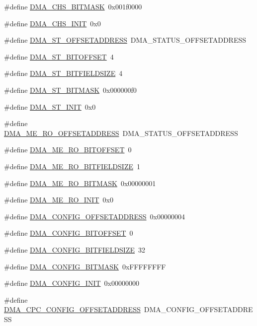 \begin{DoxyCompactItemize}
\#define \hyperlink{a00547_a206b7f6a5fd6825d63adce73eb67d29d}{DMA\_\-CHS\_\-BITMASK}~0x001f0000
\item 
\#define \hyperlink{a00547_a9e3e6d6c98a2c203c72cee4f2af8c047}{DMA\_\-CHS\_\-INIT}~0x0
\item 
\#define \hyperlink{a00547_ac7e7a79a4c4739fbf9669e6bf96cc4ff}{DMA\_\-ST\_\-OFFSETADDRESS}~DMA\_\-STATUS\_\-OFFSETADDRESS
\item 
\#define \hyperlink{a00547_ab86bc68bfb1dca7b3d90155b4103c3d0}{DMA\_\-ST\_\-BITOFFSET}~4
\item 
\#define \hyperlink{a00547_a8f73d54fc0c18d5e34dc3d38b52e7530}{DMA\_\-ST\_\-BITFIELDSIZE}~4
\item 
\#define \hyperlink{a00547_a2807548dce19bf6af704d4105594f939}{DMA\_\-ST\_\-BITMASK}~0x000000f0
\item 
\#define \hyperlink{a00547_a7225e7cc30263f04e1d64a6e733395e6}{DMA\_\-ST\_\-INIT}~0x0
\item 
\#define \hyperlink{a00547_a8374a7407aee39edbbb903b5513078a7}{DMA\_\-ME\_\-RO\_\-OFFSETADDRESS}~DMA\_\-STATUS\_\-OFFSETADDRESS
\item 
\#define \hyperlink{a00547_aa9fdcb43a5bb459dc7c50fc9efe07104}{DMA\_\-ME\_\-RO\_\-BITOFFSET}~0
\item 
\#define \hyperlink{a00547_ab191598835ef6e704ce74741f59ef514}{DMA\_\-ME\_\-RO\_\-BITFIELDSIZE}~1
\item 
\#define \hyperlink{a00547_a259092933e96607ce026d7e333d1f03d}{DMA\_\-ME\_\-RO\_\-BITMASK}~0x00000001
\item 
\#define \hyperlink{a00547_ae7e5eb61b947420f6832373c2e47c033}{DMA\_\-ME\_\-RO\_\-INIT}~0x0
\item 
\#define \hyperlink{a00547_a8a7b68f545ca97d9c238efb1ff7d9005}{DMA\_\-CONFIG\_\-OFFSETADDRESS}~0x00000004
\item 
\#define \hyperlink{a00547_aac655fa012c21874055c777f49c4c7ff}{DMA\_\-CONFIG\_\-BITOFFSET}~0
\item 
\#define \hyperlink{a00547_a622ed5f1635239477a54329777259eaf}{DMA\_\-CONFIG\_\-BITFIELDSIZE}~32
\item 
\#define \hyperlink{a00547_accf659d57fc0a37d95980ede8a99b1d6}{DMA\_\-CONFIG\_\-BITMASK}~0xFFFFFFFF
\item 
\#define \hyperlink{a00547_ada82320bd161f2e5b75c28cbd0da748c}{DMA\_\-CONFIG\_\-INIT}~0x00000000
\item 
\#define \hyperlink{a00547_aaa4e3b81c7de5fa6b230b23d3671ec8d}{DMA\_\-CPC\_\-CONFIG\_\-OFFSETADDRESS}~DMA\_\-CONFIG\_\-OFFSETADDRESS
\item 

\end{DoxyCompactItemize}
